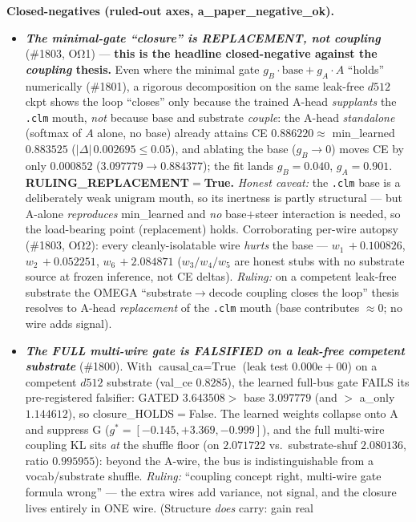 \documentclass[11pt]{article}
\begin{document}
\textbf{Closed-negatives (ruled-out axes, a\_paper\_negative\_ok).}
\begin{itemize}
\item \textbf{\emph{The minimal-gate ``closure'' is REPLACEMENT, not coupling}} (\#1803, OΩ1) ---
\textbf{this is the headline closed-negative against the \emph{coupling} thesis.} Even where the
minimal gate $g_B\!\cdot\!\text{base}+g_A\!\cdot\!A$ ``holds'' numerically (\#1801), a rigorous
decomposition on the same leak-free $d512$ ckpt shows the loop ``closes'' only because the
trained A-head \emph{supplants} the \texttt{.clm} mouth, \emph{not} because base and substrate
\emph{couple}: the A-head \emph{standalone} (softmax of $A$ alone, no base) already attains CE
$0.886220\approx$ min\_learned $0.883525$ ($|\Delta|\,0.002695\le0.05$), and ablating the base
($g_B\!\to\!0$) moves CE by only $0.000852$ ($3.097779\to0.884377$); the fit lands $g_B{=}0.040$,
$g_A{=}0.901$. \textbf{RULING\_REPLACEMENT$=$True.} \emph{Honest caveat:} the \texttt{.clm} base
is a deliberately weak unigram mouth, so its inertness is partly structural --- but A-alone
\emph{reproduces} min\_learned and \emph{no} base$+$steer interaction is needed, so the
load-bearing point (replacement) holds. Corroborating per-wire autopsy (\#1803, OΩ2): every
cleanly-isolatable wire \emph{hurts} the base --- $w_1\,{+}0.100826$, $w_2\,{+}0.052251$,
$w_6\,{+}2.084871$ ($w_3/w_4/w_5$ are honest stubs with no substrate source at frozen inference,
not CE deltas). \emph{Ruling:} on a competent leak-free substrate the OMEGA
``substrate$\rightarrow$decode coupling closes the loop'' thesis resolves to A-head
\emph{replacement} of the \texttt{.clm} mouth (base contributes $\approx0$; no wire adds signal).
\item \textbf{\emph{The FULL multi-wire gate is FALSIFIED on a leak-free competent substrate}}
(\#1800). With $\text{causal\_ca}{=}\text{True}$ (leak test $0.000\mathrm{e}{+}00$) on a
competent $d512$ substrate (val\_ce $0.8285$), the learned full-bus gate FAILS its
pre-registered falsifier: GATED $3.643508>$ base $3.097779$ (and $>$ a\_only $1.144612$), so
closure\_HOLDS$=$False. The learned weights collapse onto A and suppress G
($g^\ast=[-0.145,+3.369,-0.999]$), and the full multi-wire coupling KL sits \emph{at} the
shuffle floor (on $2.071722$ vs.\ substrate-shuf $2.080136$, ratio $0.995955$): beyond the
A-wire, the bus is indistinguishable from a vocab/substrate shuffle. \emph{Ruling:} ``coupling
concept right, multi-wire gate formula wrong'' --- the extra wires add variance, not signal,
and the closure lives entirely in ONE wire. (Structure \emph{does} carry: gain real

\end{itemize}
\end{document}
